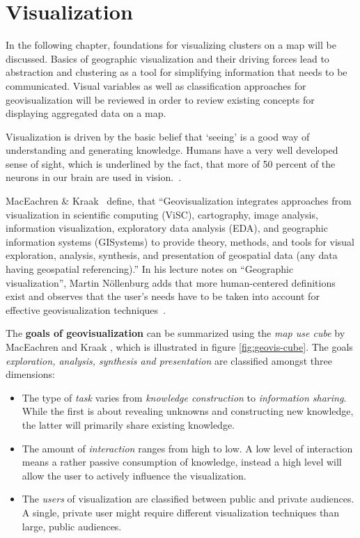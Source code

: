 
%
%

\section{Visualization}
\label{chapter:foundations-vis}

In the following chapter, foundations for visualizing clusters on a map will be discussed. Basics of geographic visualization and their driving forces lead to abstraction and clustering as a tool for simplifying information that needs to be communicated. Visual variables as well as classification approaches for geovisualization will be reviewed in order to review existing concepts for displaying aggregated data on a map.

Visualization is driven by the basic belief that `seeing' is a good way of understanding and generating knowledge. Humans have a very well developed sense of sight, which is underlined by the fact, that more of 50 percent of the neurons in our brain are used in vision.~\cite{vislecture}. 

MacEachren \& Kraak~\cite{maceachren-geovis} define, that ``Geovisualization integrates approaches from visualization in scientific computing (ViSC), cartography, image analysis, information visualization, exploratory data analysis (EDA), and geographic information systems (GISystems) to provide theory, methods, and tools for visual exploration, analysis, synthesis, and presentation of geospatial data (any data having geospatial referencing).'' In his lecture notes on ``Geographic visualization'', Martin N\"{o}llenburg adds that more human-centered definitions exist and observes that the user's needs have to be taken into account for effective geovisualization techniques~\cite{noellenburg11geovis}.


The \textbf{goals of geovisualization} can be summarized using the \textit{map use cube} by MacEachren and Kraak \cite{MacEachren07cartovis}, which is illustrated in figure \ref{fig:geovis-cube}. The goals \textit{exploration, analysis, synthesis and presentation} are classified amongst three dimensions:

\begin{itemize}

\item The type of \textit{task} varies from \textit{knowledge construction} to \textit{information sharing}. While the first is about revealing unknowns and constructing new knowledge, the latter will primarily share existing knowledge.

\item The amount of \textit{interaction} ranges from high to low. A low level of interaction means a rather passive consumption of knowledge, instead a high level will allow the user to actively influence the visualization.

\item The \textit{users} of visualization are classified between public and private audiences. A single, private user might require different visualization techniques than large, public audiences.

\end{itemize}

